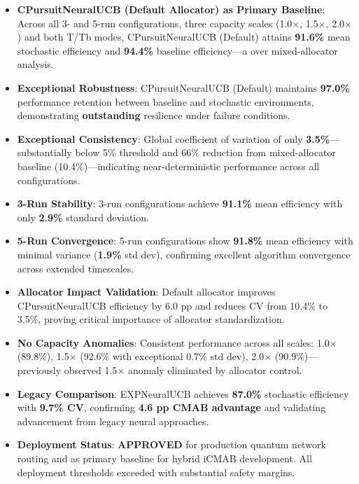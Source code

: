 \documentclass[12pt,a4paper]{article}
\newcommand{\primarytext}[1]{\textcolor{primaryblue}{\textbf{#1}}}
\newcommand{\success}[1]{\textcolor{accentgreen}{\textbf{#1}}}
\newcommand{\legacy}[1]{\textcolor{legacycolor}{\textbf{#1}}}
\begin{document}
\begin{tcolorbox}[colback=highlightgray,colframe=primaryblue,title=\textbf{Executive Summary - Key Findings (Default Allocator Only)}]
\begin{itemize}
    \item \primarytext{CPursuitNeuralUCB (Default Allocator) as Primary Baseline}: Across all 3- and 5-run configurations, three capacity scales (1.0$\times$, 1.5$\times$, 2.0$\times$) and both T/Tb modes, CPursuitNeuralUCB (Default) attains \success{91.6\%} mean stochastic efficiency and \success{94.4\%} baseline efficiency—a  over mixed-allocator analysis.
    
    \item \success{Exceptional Robustness}: CPursuitNeuralUCB (Default) maintains \success{97.0\%} performance retention between baseline and stochastic environments, demonstrating \textbf{outstanding} resilience under failure conditions.
    
    \item \success{Exceptional Consistency}: Global coefficient of variation of only \success{3.5\%}—substantially below 5\% threshold and 66\% reduction from mixed-allocator baseline (10.4\%)—indicating near-deterministic performance across all configurations.
    
    \item \success{3-Run Stability}: 3-run configurations achieve \success{91.1\%} mean efficiency with only \success{2.9\%} standard deviation.
    
    \item \success{5-Run Convergence}: 5-run configurations show \success{91.8\%} mean efficiency with minimal variance (\success{1.9\%} std dev), confirming excellent algorithm convergence across extended timescales.
    
    \item \success{Allocator Impact Validation}: Default allocator improves CPursuitNeuralUCB efficiency by 6.0 pp and reduces CV from 10.4\% to 3.5\%, proving critical importance of allocator standardization.
    
    \item \success{No Capacity Anomalies}: Consistent performance across all scales: 1.0$\times$ (89.8\%), 1.5$\times$ (92.6\% with exceptional 0.7\% std dev), 2.0$\times$ (90.9\%)—previously observed 1.5$\times$ anomaly eliminated by allocator control.
    
    \item \legacy{Legacy Comparison}: EXPNeuralUCB achieves \legacy{87.0\%} stochastic efficiency with \legacy{9.7\% CV}, confirming \success{4.6 pp CMAB advantage} and validating advancement from legacy neural approaches.
    
    \item \success{Deployment Status}: \textbf{APPROVED} for production quantum network routing and as primary baseline for hybrid iCMAB development. All deployment thresholds exceeded with substantial safety margins.
\end{itemize}
\end{tcolorbox}
\end{document}
